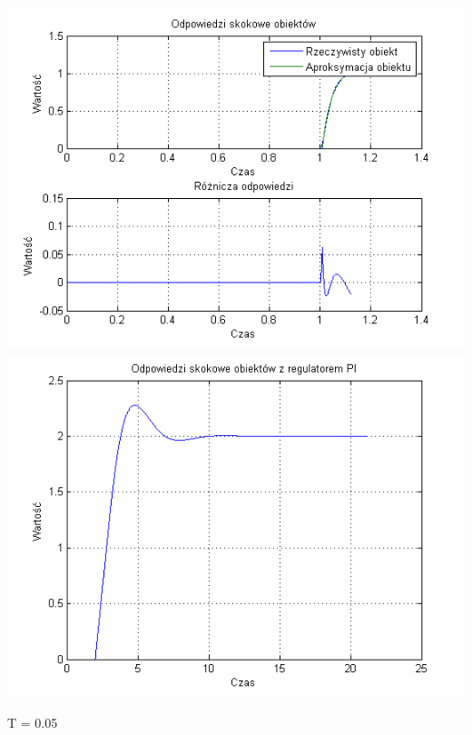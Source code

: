 \documentclass[10pt,a4paper]{article}
\begin{document}
\begin{center}
\includegraphics[scale=1]{images/jeden/skrypt_45.png}\\
\includegraphics[scale=1]{images/jeden/skrypt_46.png}\\
\end{center}
\newpage
T = 0.05
\end{document}

